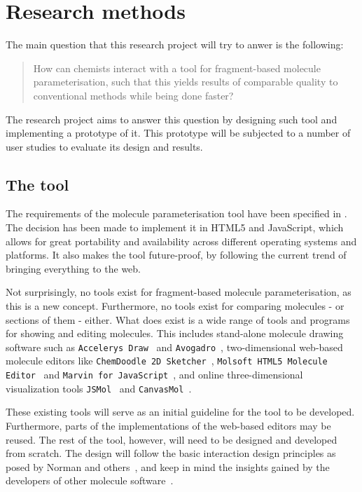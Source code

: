 \chapter{Research methods}

The main question that this research project will try to anwer is the following:
\begin{quote}
How can chemists interact with a tool for fragment-based molecule parameterisation, such that this yields results of comparable quality to conventional methods while being done faster?
\end{quote}
The research project aims to answer this question by designing such tool and implementing a prototype of it. This prototype will be subjected to a number of user studies to evaluate its design and results.


\section{The tool}

The requirements of the molecule parameterisation tool have been specified in . The decision has been made to implement it in HTML5 and JavaScript, which allows for great portability and availability across different operating systems and platforms. It also makes the tool future-proof, by following the current trend of bringing everything to the web.

Not surprisingly, no tools exist for fragment-based molecule parameterisation, as this is a new concept. Furthermore, no tools exist for comparing molecules - or sections of them - either. What does exist is a wide range of tools and programs for showing and editing molecules. This includes stand-alone molecule drawing software such as \verb|Accelerys Draw|~\cite{accelrys2012accelrys} and \verb|Avogadro|~\cite{hanwell2012avogadro}, two-dimensional web-based molecule editors like \verb|ChemDoodle 2D Sketcher|~\cite{ichemlabs2013chemdoodle}, \verb|Molsoft HTML5 Molecule Editor|~\cite{molsoft2012molsoft} and \verb|Marvin for JavaScript|~\cite{chemxon2013marvin}, and online three-dimensional visualization tools \verb|JSMol|~\cite{hanson2013jsmol} and \verb|CanvasMol|~\cite{altered2013canvasmol}.

These existing tools will serve as an initial guideline for the tool to be developed. Furthermore, parts of the implementations of the web-based editors may be reused. The rest of the tool, however, will need to be designed and developed from scratch. The design will follow the basic interaction design principles as posed by Norman and others~\cite{norman2002design, norman1990interfaces, norman2002emotion, norman2005human, norman2010gestural, thimbleby2007press, blair2008user, badre2002shaping}, and keep in mind the insights gained by the developers of other molecule software~\cite{ertl2010molecular, hanson2013jsmol, bienfait2013jsme, ekins2013tb, fjeld2007tangible, ertl2012molecule}.


